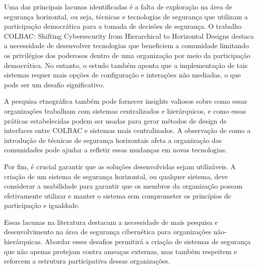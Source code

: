 Uma das principais lacunas identificadas é a falta de exploração na área de
segurança horizontal, ou seja, técnicas e tecnologias de segurança que utilizam a
participação democrática para a tomada de decisões de segurança. O trabalho COLBAC:
Shifting Cybersecurity from Hierarchical to Horizontal Designs destaca a necessidade
de desenvolver tecnologias que beneficiem a comunidade limitando os privilégios
dos poderosos dentro de uma organização por meio da participação democrática. No
entanto, o estudo também aponta que a implementação de tais sistemas requer mais opções
de configuração e interações não mediadas, o que pode ser um desafio
significativo. 

A pesquisa etnográfica também pode fornecer insights valiosos sobre como essas
organizações trabalham com sistemas centralizados e hierárquicos, e como essas práticas
estabelecidas podem ser usadas para gerar métodos de design de interfaces entre COLBAC e
sistemas mais centralizados. A observação de como a introdução de técnicas de segurança
horizontais afeta a organização das comunidades pode ajudar a refletir essas mudanças em
novas tecnologias. 

Por fim, é crucial garantir que as soluções desenvolvidas sejam utilizáveis. A
criação de um sistema de segurança horizontal, ou qualquer sistema, deve considerar a
usabilidade para garantir que os membros da organização possam efetivamente utilizar e
manter o sistema sem comprometer os princípios de participação e igualdade.

Essas lacunas na literatura destacam a necessidade de mais pesquisa e
desenvolvimento na área de segurança cibernética para organizações não-hierárquicas.
Abordar esses desafios permitirá a criação de sistemas de segurança que não apenas
protejam contra ameaças externas, mas também respeitem e reforcem a estrutura participativa
dessas organizações. 

